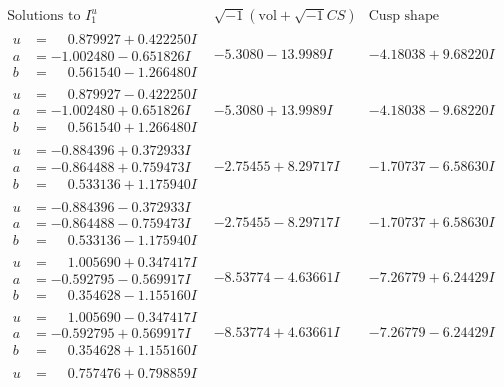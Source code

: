 \documentclass[1p]{elsarticle_modified}
\theoremstyle{definition}
\newcommand{\I}{\sqrt{-1}}
\begin{document}
$$\begin{array}{c|c|c}  
\text{Solutions to }I^u_{1}& \I (\text{vol} + \sqrt{-1}CS) & \text{Cusp shape}\\
 \hline 
\begin{aligned}
u &= \phantom{-}0.879927 + 0.422250 I \\
a &= -1.002480 - 0.651826 I \\
b &= \phantom{-}0.561540 - 1.266480 I\end{aligned}
 & -5.3080 - 13.9989 I & -4.18038 + 9.68220 I \\ \hline\begin{aligned}
u &= \phantom{-}0.879927 - 0.422250 I \\
a &= -1.002480 + 0.651826 I \\
b &= \phantom{-}0.561540 + 1.266480 I\end{aligned}
 & -5.3080 + 13.9989 I & -4.18038 - 9.68220 I \\ \hline\begin{aligned}
u &= -0.884396 + 0.372933 I \\
a &= -0.864488 + 0.759473 I \\
b &= \phantom{-}0.533136 + 1.175940 I\end{aligned}
 & -2.75455 + 8.29717 I & -1.70737 - 6.58630 I \\ \hline\begin{aligned}
u &= -0.884396 - 0.372933 I \\
a &= -0.864488 - 0.759473 I \\
b &= \phantom{-}0.533136 - 1.175940 I\end{aligned}
 & -2.75455 - 8.29717 I & -1.70737 + 6.58630 I \\ \hline\begin{aligned}
u &= \phantom{-}1.005690 + 0.347417 I \\
a &= -0.592795 - 0.569917 I \\
b &= \phantom{-}0.354628 - 1.155160 I\end{aligned}
 & -8.53774 - 4.63661 I & -7.26779 + 6.24429 I \\ \hline\begin{aligned}
u &= \phantom{-}1.005690 - 0.347417 I \\
a &= -0.592795 + 0.569917 I \\
b &= \phantom{-}0.354628 + 1.155160 I\end{aligned}
 & -8.53774 + 4.63661 I & -7.26779 - 6.24429 I \\ \hline\begin{aligned}
u &= \phantom{-}0.757476 + 0.798859 I \\

\end{aligned}
\end{array}$$
\end{document}
